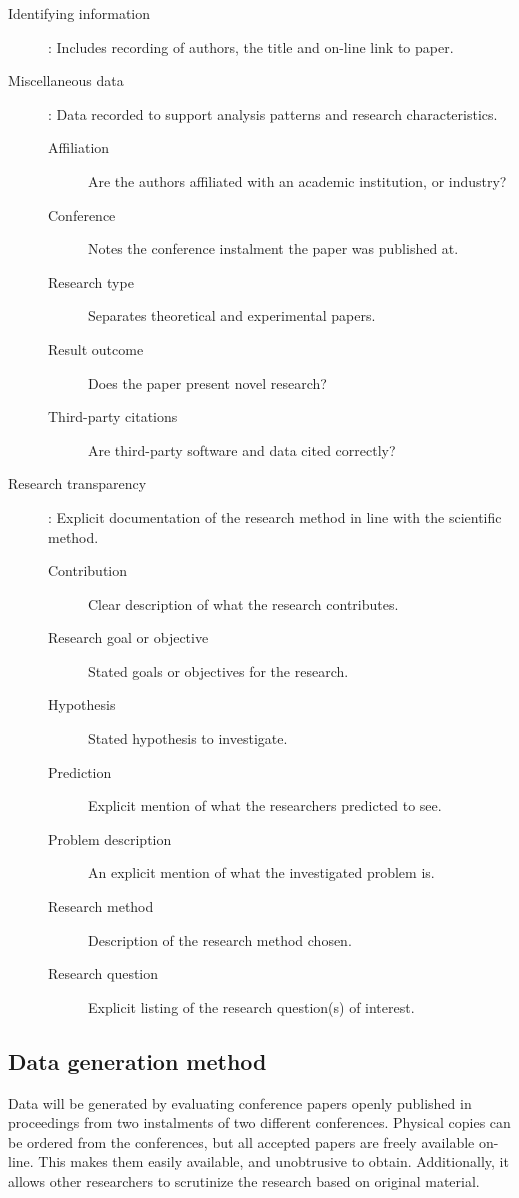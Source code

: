 \begin{description}
\item[Identifying information]: Includes recording of authors, the title and on-line link to paper.
\item[Miscellaneous data]: Data recorded to support analysis patterns and research characteristics.
    \begin{description}
    \item[Affiliation] Are the authors affiliated with an academic institution, or industry?
    \item[Conference] Notes the conference instalment the paper was published at.
    \item[Research type] Separates theoretical and experimental papers.
    \item[Result outcome] Does the paper present novel research?
    \item[Third-party citations] Are third-party software and data cited correctly?
    \end{description}
\item[Research transparency]: Explicit documentation of the research method in line with the scientific method.
    \begin{description}
    \item[Contribution] Clear description of what the research contributes.
    \item[Research goal or objective] Stated goals or objectives for the research.
    \item[Hypothesis] Stated hypothesis to investigate.
    \item[Prediction] Explicit mention of what the researchers predicted to see.
    \item[Problem description] An explicit mention of what the investigated problem is.
    \item[Research method] Description of the research method chosen.
    \item[Research question] Explicit listing of the research question(s) of interest.
    \end{description}
\end{description}

\subsection{Data generation method}
\label{sec:data-generation}
Data will be generated by evaluating conference papers openly published in proceedings from two instalments of two different conferences. Physical copies can be ordered from the conferences, but all accepted papers are freely available on-line. This makes them easily available, and unobtrusive to obtain. Additionally, it allows other researchers to scrutinize the research based on original material.

